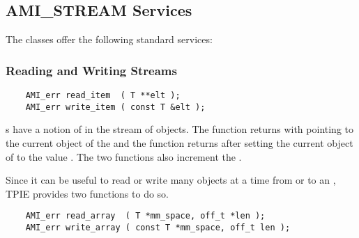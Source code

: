 



\subsection{AMI\_STREAM Services}
\noindent
The  classes offer the following
standard services: 

\subsubsection{Reading and Writing Streams}

\begin{verbatim}
    AMI_err read_item  ( T **elt );
    AMI_err write_item ( const T &elt );
\end{verbatim}

s have a notion of  in the stream of
objects. The  function returns with 
pointing to the current object of the  and the
 function returns after setting the current object
of  to the value . The two functions also
increment the .

Since it can be useful to read or write many objects at a time from or to
an , TPIE provides two functions to do so.

\begin{verbatim}
    AMI_err read_array  ( T *mm_space, off_t *len );
    AMI_err write_array ( const T *mm_space, off_t len );
\end{verbatim}

